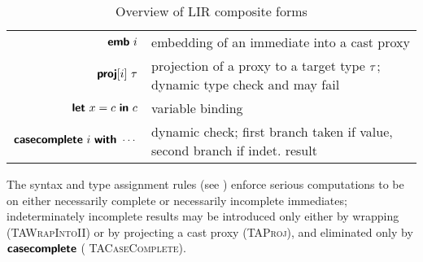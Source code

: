 \documentclass[index.tex]{subfiles}
\begin{document}
\begin{table}
\begin{center}
\begin{tabular}{rl}
      $\textsf{\textbf{emb}}~ i$
        & embedding of an immediate into a cast proxy \\

      $\textsf{\textbf{proj}}[i]~ \tau$
        & projection of a proxy to a target type $\tau$; dynamic type check and may fail \\

      $\textsf{\textbf{{let}}}~ x = c ~\textsf{\textbf{{in}}}~ c$
        & variable binding \\

      $\textsf{\textbf{casecomplete}}~ i ~\textsf{\textbf{{with}}} ~\cdots$
        & dynamic check; first branch taken if value, second branch if indet. result
    \end{tabular}
  \end{center}
  \caption{Overview of LIR composite forms}
  \label{fig:lir-syntax-comp}
\end{table}

The syntax and type assignment rules (see ) enforce serious computations to be
on either necessarily complete or necessarily incomplete immediates; indeterminately incomplete
results may be introduced only either by wrapping (\textsc{\small TAWrapIntoII}) or by projecting a
cast proxy (\textsc{\small TAProj}), and eliminated only by $\textsf{\textbf{casecomplete}}$ (\textsc{\small
TACaseComplete}).
\end{document}
